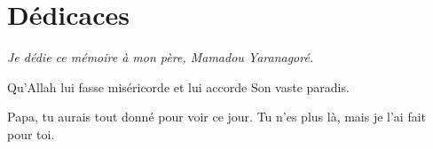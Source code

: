 \chapter*{Dédicaces}

\vspace*{3cm}
\begin{flushright}
\begin{minipage}{0.75\textwidth}
\itshape
Je dédie ce mémoire à mon père, Mamadou Yaranagoré.

Qu'Allah lui fasse miséricorde et lui accorde Son vaste paradis.

Papa, tu aurais tout donné pour voir ce jour. Tu n'es plus là, mais je l'ai fait pour toi.
\end{minipage}
\end{flushright}
